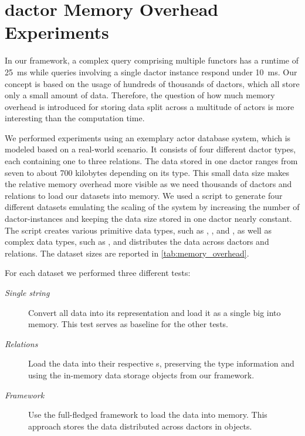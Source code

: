 
\section[Dactor Memory Overhead Experiments]{\Gls{dactor} Memory Overhead Experiments}\label{sec:experiments}

  In our framework, a complex query comprising multiple \glspl{functor} has a runtime of 25~ms while queries involving a single \gls{dactor} instance respond under 10~ms.
  Our concept is based on the usage of hundreds of thousands of \glspl{dactor}, which all store only a small amount of data.
  Therefore, the question of how much memory overhead is introduced for storing data split across a multitude of actors is more interesting than the computation time.

  We performed experiments using an exemplary actor database system, which is modeled based on a real-world scenario.
  It consists of four different \gls{dactor} types, each containing one to three relations.
  The data stored in one \gls{dactor} ranges from seven to about 700 kilobytes depending on its type.
  This small data size makes the relative memory overhead more visible as we need thousands of \glspl{dactor} and relations to load our datasets into memory.
  We used a script to generate four different datasets emulating the scaling of the system by increasing the number of \gls{dactor}-instances and keeping the data size stored in one \gls{dactor} nearly constant.
  The script creates various primitive data types, such as , , and , as well as complex data types, such as , and distributes the data across \glspl{dactor} and relations.
  The dataset sizes are reported in \cref{tab:memory_overhead}.

  For each dataset we performed three different tests:
  \begin{description}
    \item[\textit{Single string}] Convert all data into its  representation and load it as a single big  into memory.
    This test serves as baseline for the other tests.
    \item[\textit{Relations}] Load the data into their respective s, preserving the type information and using the in-memory data storage objects from our framework.
    \item[\textit{Framework}] Use the full-fledged framework to load the data into memory.
    This approach stores the data distributed across \glspl{dactor} in  objects.
  \end{description}

